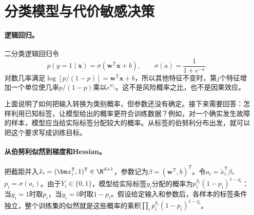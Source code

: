 \section{分类模型与代价敏感决策}
\paragraph{逻辑回归。}
二分类逻辑回归令
\begin{equation}
 p(y=1\mid\bm{x})=\sigma(\bm{w}^{\mathsf T}\bm{x}+b),
 \qquad \sigma(a)=\frac{1}{1+e^{-a}}.
\end{equation}
对数几率满足$\log[p/(1-p)]=\bm{w}^{\mathsf T}\bm{x}+b$，所以其他特征不变时，第$j$个特征增加一个单位使几率$p/(1-p)$乘以$e^{w_j}$。这不是风险概率之比，也不是因果效应。

上面说明了如何把输入转换为类别概率，但参数还没有确定。接下来需要回答：怎样利用已知标签，让模型给出的概率更符合训练数据？例如，对一个确实发生故障的样本，模型应当给实际标签分配较大的概率。从标签的伯努利分布出发，就可以把这个要求写成训练目标。

\paragraph{从伯努利似然到梯度和Hessian。}
把截距并入$\tilde x_i=(\bm x_i^{\mathsf T},1)^{\mathsf T}\in\R^{d+1}$，参数记为$\beta=(\bm w^{\mathsf T},b)^{\mathsf T}$。令$a_i=\tilde x_i^{\mathsf T}\beta$、$p_i=\sigma(a_i)$。由于$Y_i\in\{0,1\}$，模型给实际标签$y_i$分配的概率为$p_i^{y_i}(1-p_i)^{1-y_i}$：当$y_i=1$时取$p_i$，当$y_i=0$时取$1-p_i$。假设给定输入和参数后，各样本的标签条件独立，整个训练集的似然就是这些概率的乘积$\prod_i p_i^{y_i}(1-p_i)^{1-y_i}$。

